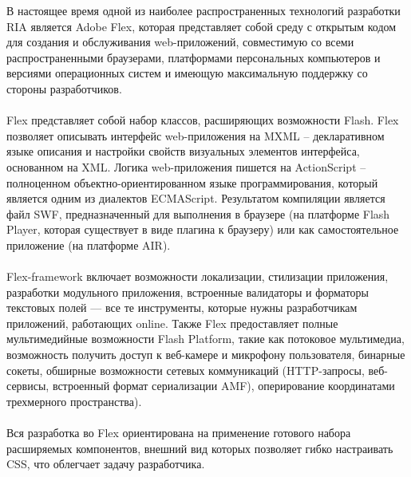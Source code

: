 В настоящее время одной из наиболее распространенных технологий разработки RIA является Adobe Flex,  которая представляет собой  среду с открытым кодом для создания и обслуживания web-приложений, совместимую со всеми распространенными браузерами,  платформами персональных компьютеров и версиями операционных систем и имеющую максимальную поддержку со стороны разработчиков. 

\paragraph{ }

Flex представляет собой набор классов,  расширяющих возможности Flash. Flex позволяет описывать интерфейс web-приложения на MXML – декларативном языке описания и настройки свойств визуальных элементов интерфейса, основанном на XML. Логика web-приложения пишется на ActionScript –  полноценном объектно-ориентированном языке программирования,  который является одним из диалектов ECMAScript. Результатом компиляции является файл SWF,  предназначенный для выполнения в браузере (на платформе Flash Player,  которая существует в виде плагина к браузеру)  или как самостоятельное приложение (на платформе AIR).

\paragraph{ }
  
Flex-framework включает возможности локализации, стилизации приложения, разработки модульного приложения, встроенные валидаторы и форматоры текстовых полей — все те инструменты, которые нужны разработчикам приложений, работающих online. Также Flex предоставляет полные мультимедийные возможности Flash Platform, такие как потоковое мультимедиа,  возможность получить доступ к веб-камере и микрофону пользователя, бинарные сокеты, обширные возможности сетевых коммуникаций (HTTP-запросы, веб-сервисы, встроенный формат сериализации AMF), оперирование координатами трехмерного пространства).

\paragraph{ }

Вся разработка во Flex  ориентирована на применение готового набора
расширяемых компонентов,  внешний вид которых позволяет гибко
настраивать CSS, что облегчает задачу разработчика. 

\paragraph{ }

